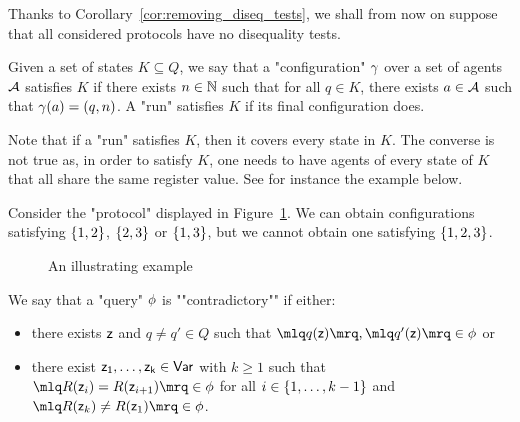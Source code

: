 Thanks to Corollary~\ref{cor:removing_diseq_tests}, we shall from now on suppose that all considered protocols have no disequality tests. 

\begin{definition}
	Given a set of states $K \subseteq Q$, we say that a "configuration" $\gamma$ over a set of agents $\mathcal{A}$ satisfies $K$ if there exists $n \in \mathbb{N}$ such that for all $q \in K$, there exists $a \in \mathcal{A}$ such that $\gamma(a) = (q,n)$.
	A "run" satisfies $K$ if its final configuration does.
\end{definition}
Note that if a "run" satisfies $K$, then it covers every state in $K$. The converse is not true as, in order to satisfy $K$, one needs to have agents of every state of $K$ that all share the same register value. See for instance the example below.

\begin{ex}
	Consider the "protocol" displayed in Figure~\ref{fig:no-clique}.
	We can obtain configurations satisfying $\{1,2\}$, $\{2,3\}$ or $\{1,3\}$, but we cannot obtain one satisfying $\{1,2,3\}$.
	
	\begin{figure}[h]
		
		\caption{An illustrating example}
		\label{fig:no-clique}
	\end{figure}
\end{ex}



\begin{definition}
We say that a "query" $\phi$ is ""contradictory"" if either:
	\begin{itemize}
		\item there exists $\mathsf{z}$ and $q \neq q' \in Q$ such that $\quotemarks{q(\varz)}, \quotemarks{q'(\varz)} \in \query$ or
		
		\item there exist $\mathsf{z_1}, \ldots, \mathsf{z_k} \in \mathsf{Var}$ with $k\geq 1$ such that $\quotemarks{R(\varz_{i}) = R(\varz_{i+1})} \in \query$ for all $i \in \{1,\ldots,k-1\}$ and $\quotemarks{R(\varz_k) \neq R(\varz_1)} \in \query$.
	\end{itemize}
\end{definition}

